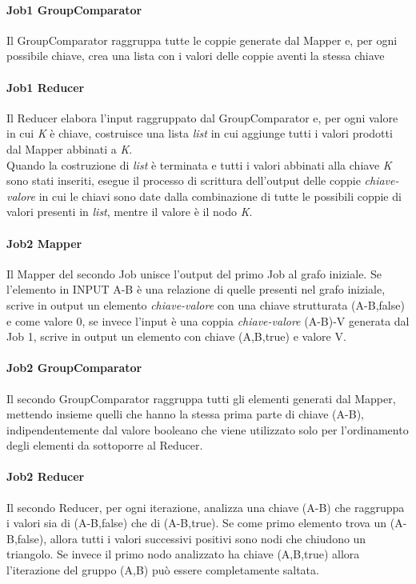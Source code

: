 \documentclass[paper=a4, fontsize=11pt]{scrartcl}	%
\numberwithin{equation}{section}															%
\numberwithin{figure}{section}																%
\numberwithin{table}{section}																%
\begin{document}
\paragraph{Job1 GroupComparator}
Il GroupComparator raggruppa tutte le coppie generate dal Mapper e, per ogni possibile chiave, crea una lista con i valori delle coppie aventi la stessa chiave
\paragraph{Job1 Reducer}

Il Reducer elabora l'input raggruppato dal GroupComparator e, per ogni valore in cui \textit{K} è chiave, costruisce una lista \textit{list} in cui aggiunge tutti i valori prodotti dal Mapper abbinati a \textit{K}.\\
Quando la costruzione di \textit{list} è terminata e tutti i valori abbinati alla chiave \textit{K} sono stati inseriti, esegue il processo di scrittura dell'output delle coppie \textit{chiave-valore} in cui le chiavi sono date dalla combinazione di tutte le possibili coppie di valori presenti in \textit{list}, mentre il valore è il nodo \textit{K}.

\paragraph{Job2 Mapper}
Il Mapper del secondo Job unisce l'output del primo Job al grafo iniziale. Se l'elemento in INPUT A-B è una relazione di quelle presenti nel grafo iniziale, scrive in output un elemento \textit{chiave-valore} con una chiave strutturata (A-B,false) e come valore 0, se invece l'input è una coppia \textit{chiave-valore} (A-B)-V generata dal Job 1, scrive in output un elemento con chiave (A,B,true) e valore V.
\paragraph{Job2 GroupComparator}
Il secondo GroupComparator raggruppa tutti gli elementi generati dal Mapper, mettendo insieme quelli che hanno la stessa prima parte di chiave (A-B), indipendentemente dal valore booleano che viene utilizzato solo per l'ordinamento degli elementi da sottoporre al Reducer.

\paragraph{Job2 Reducer}
Il secondo Reducer, per ogni iterazione, analizza una chiave (A-B) che raggruppa i valori sia di (A-B,false) che di (A-B,true). Se come primo elemento trova un (A-B,false), allora tutti i valori successivi positivi sono nodi che chiudono un triangolo. Se invece il primo nodo analizzato ha chiave (A,B,true) allora l'iterazione del gruppo (A,B) può essere completamente saltata.
\end{document}
